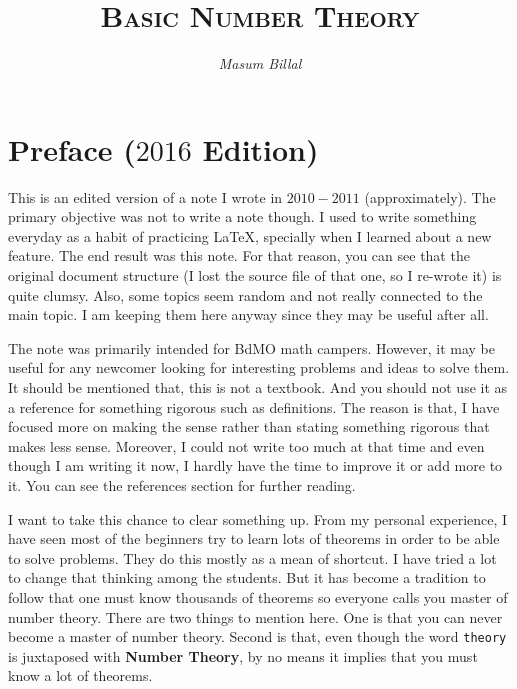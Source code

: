 \documentclass[a4paper, 12pt, leqno]{article}
\author{\itshape Masum Billal}
\title{\scshape Basic Number Theory}
\theoremstyle{definition}
\theoremstyle{remark}
\begin{document}
	\maketitle
	\titlepage
	\section*{Preface ($2016$ Edition)}
		This is an edited version of a note I wrote in $2010-2011$ (approximately). The primary objective was not to write a note though. I used to write something everyday as a habit of practicing \LaTeX, specially when I learned about a new feature. The end result was this note. For that reason, you can see that the original document structure (I lost the source file of that one, so I re-wrote it) is quite clumsy. Also, some topics seem random and not really connected to the main topic. I am keeping them here anyway since they may be useful after all.
		
		The note was primarily intended for BdMO math campers. However, it may be useful for any newcomer looking for interesting problems and ideas to solve them. It should be mentioned that, this is not a textbook. And you should not use it as a reference for something rigorous such as definitions. The reason is that, I have focused more on making the sense rather than stating something rigorous that makes less sense. Moreover, I could not write too much at that time and even though I am writing it now, I hardly have the time to improve it or add more to it. You can see the references section for further reading.
		
		I want to take this chance to clear something up. From my personal experience, I have seen most of the beginners try to learn lots of theorems in order to be able to solve problems. They do this mostly as a mean of shortcut. I have tried a lot to change that thinking among the students. But it has become a tradition to follow that one must know thousands of theorems so everyone calls you master of number theory. There are two things to mention here. One is that you can never become a master of number theory. Second is that, even though the word \texttt{theory} is juxtaposed with \textbf{Number Theory}, by no means it implies that you must know a lot of theorems.
		
\end{document}
